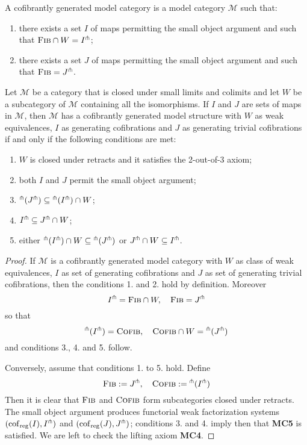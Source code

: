 \begin{refsection}
\begin{defin}
A cofibrantly generated model category is a model category $\mathcal M$ such that:
\begin{enumerate}
\item there exists a set $I$ of maps permitting the small object argument and such that $\textsc{Fib} \cap W = I^{\pitchfork}$;
\item there exists a set $J$ of maps permitting the small object argument and such that $\textsc{Fib} = J^{\pitchfork}$.
\end{enumerate}
\end{defin}

\begin{thm} \label{thm recognizing}
Let $\mathcal M$ be a category that is closed under small limits and colimits and let $W$ be a subcategory of $\mathcal M$ containing all the isomorphisms. If $I$ and $J$ are sets of maps in $\mathcal M$, then $\mathcal M$ has a cofibrantly generated model structure with $W$ as weak equivalences, $I$ as generating cofibrations and $J$ as generating trivial cofibrations if and only if the following conditions are met:
\begin{enumerate}
\item $W$ is closed under retracts and it satisfies the 2-out-of-3 axiom;
\item both $I$ and $J$ permit the small object argument;
\item ${}^{\pitchfork}(J^{\pitchfork}) \subseteq {}^{\pitchfork}(I^{\pitchfork}) \cap W$;
\item $I^{\pitchfork} \subseteq J^{\pitchfork} \cap W$;
\item either ${}^{\pitchfork}(I^{\pitchfork}) \cap W \subseteq {}^{\pitchfork}(J^{\pitchfork})$ or $J^{\pitchfork} \cap W \subseteq I^{\pitchfork}$.
\end{enumerate}
\end{thm}

\begin{proof}
If $\mathcal M$ is a cofibrantly generated model category with $W$ as class of weak equivalences, $I$ as set of generating cofibrations and $J$ as set of generating trivial cofibrations, then the conditions 1. and 2. hold by definition. Moreover
\[
I^{\pitchfork} = \textsc{Fib} \cap W, \quad \textsc{Fib} = J^{\pitchfork}
\]
so that
\[
{}^{\pitchfork}(I^{\pitchfork}) = \textsc{Cofib}, \quad \textsc{Cofib} \cap W = {}^{\pitchfork}(J^{\pitchfork})
\]
and conditions 3., 4. and 5. follow.

Conversely, assume that conditions 1. to 5. hold. Define
\[
\textsc{Fib} := J^{\pitchfork}, \quad \textsc{Cofib} := {}^{\pitchfork}(I^{\pitchfork})
\]
Then it is clear that $\textsc{Fib}$ and $\textsc{Cofib}$ form subcategories closed under retracts. The small object argument produces functorial weak factorization systems $(\mathrm{cof}_{\mathrm{reg}}(I), I^{\pitchfork})$ and $(\mathrm{cof}_{\mathrm{reg}}(J), J^{\pitchfork})$; conditions 3. and 4. imply then that {\bfseries MC5} is satisfied. We are left to check the lifting axiom {\bfseries MC4}.


\end{proof}
\end{refsection}
